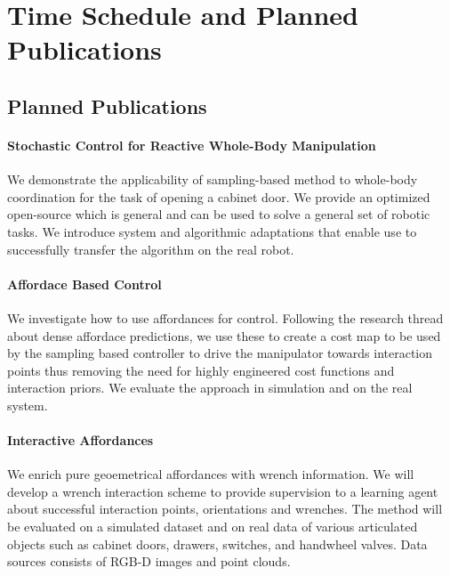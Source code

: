 \section{Time Schedule and Planned Publications}
\label{sec:time_schedule}


\subsection{Planned Publications}
\paragraph{Stochastic Control for Reactive Whole-Body Manipulation} We demonstrate the applicability of sampling-based method to whole-body coordination for the task of opening a cabinet door. We provide an optimized open-source which is general and can be used to solve a general set of robotic tasks. We introduce system and algorithmic adaptations that enable use to successfully transfer the algorithm on the real robot.

\paragraph{Affordace Based Control} We investigate how to use affordances for control. Following the research thread about dense affordace predictions, we use these to create a cost map to be used by the sampling based controller to drive the manipulator towards interaction points thus removing the need for highly engineered cost functions and interaction priors. We evaluate the approach in simulation and on the real system. 

\paragraph{Interactive Affordances} We enrich pure geoemetrical affordances with wrench information. We will develop a wrench interaction scheme to provide supervision to a learning agent about successful interaction points, orientations and wrenches. The method will be evaluated on a simulated dataset and on real data of various articulated objects such as cabinet doors, drawers, switches, and handwheel valves. Data sources consists of RGB-D images and point clouds. 


